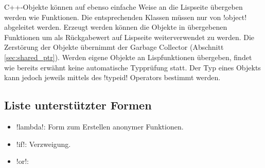 C++-Objekte können auf ebenso einfache Weise an die Lispseite übergeben werden wie Funktionen. Die entsprechenden Klassen müssen nur von !object! abgeleitet werden. Erzeugt werden können die Objekte in übergebenen Funktionen um als Rückgabewert auf Lispseite weiterverwendet zu werden. Die Zerstörung der Objekte übernimmt der Garbage Collector (Abschnitt \ref{sec:shared_ptr}). Werden eigene Objekte an Lispfunktionen übergeben, findet wie bereits erwähnt keine automatische Typprüfung statt. Der Typ eines Objekts kann jedoch jeweils mittels des !typeid! Operators bestimmt werden.

\subsection{Liste unterstützter Formen}
\begin{itemize}
\item !lambda!: Form zum Erstellen anonymer Funktionen.
\item !if!: Verzweigung.
\item !or!: 
\end{itemize}